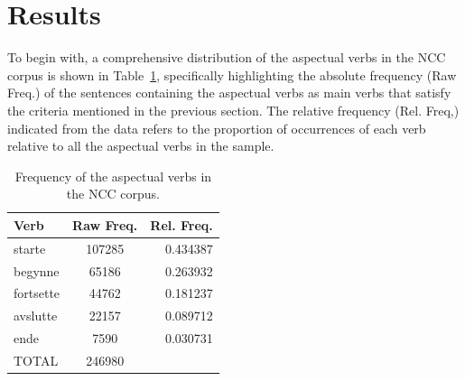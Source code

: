 \documentclass{article}
\begin{document}
\section{Results}
To begin with, a comprehensive distribution of the aspectual verbs in the NCC corpus is shown in Table~\ref{frequency_aspectual_verbs}, specifically highlighting the absolute frequency (Raw Freq.) of the sentences containing the aspectual verbs as main verbs that satisfy the criteria mentioned in the previous section. The relative frequency (Rel. Freq,) indicated from the data refers to the proportion of occurrences of each verb relative to all the aspectual verbs in the sample. 
\begin{table}[h!]
\begin{center}    
\caption{Frequency of the aspectual verbs in the NCC corpus. }
\label{frequency_aspectual_verbs}
\begin{tabular}{lcr}
\toprule\toprule
Verb &    Raw Freq. &  Rel. Freq.\\
\hline
 starte &  107285 &               0.434387  \\
begynne &   65186 &               0.263932  \\
 fortsette &   44762 &               0.181237 \\
avslutte &   22157 &               0.089712  \\
 ende &    7590 &               0.030731  \\
  \hline
 TOTAL & 246980\\
\bottomrule
\end{tabular}
\end{center}

\end{table}
\end{document}
